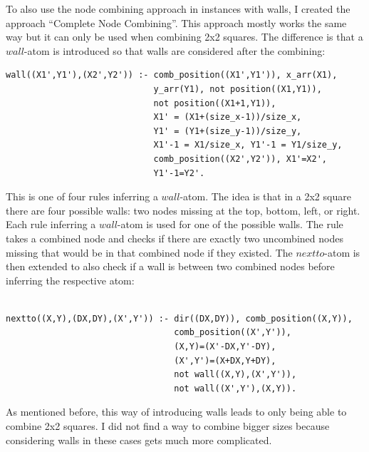 \documentclass[runningheads]{llncs}
\begin{document}
To also use the node combining approach in instances with walls, I created the approach ``Complete Node Combining''. This approach mostly works the same way but it can only be used when combining 2x2 squares. The difference is that a $wall$-atom is introduced so that walls are considered after the combining:
\begin{verbatim}
wall((X1',Y1'),(X2',Y2')) :- comb_position((X1',Y1')), x_arr(X1), 
                             y_arr(Y1), not position((X1,Y1)), 
                             not position((X1+1,Y1)),
                             X1' = (X1+(size_x-1))/size_x, 
                             Y1' = (Y1+(size_y-1))/size_y,
                             X1'-1 = X1/size_x, Y1'-1 = Y1/size_y,
                             comb_position((X2',Y2')), X1'=X2', 
                             Y1'-1=Y2'.
\end{verbatim}
This is one of four rules inferring a $wall$-atom. The idea is that in a 2x2 square there are four possible walls: two nodes missing at the top, bottom, left, or right. Each rule inferring a $wall$-atom is used for one of the possible walls. The rule takes a combined node and checks if there are exactly two uncombined nodes missing that would be in that combined node if they existed. The $nextto$-atom is then extended to also check if a wall is between two combined nodes before inferring the respective atom:
\begin{verbatim}

nextto((X,Y),(DX,DY),(X',Y')) :- dir((DX,DY)), comb_position((X,Y)), 
                                 comb_position((X',Y')),
                                 (X,Y)=(X'-DX,Y'-DY), 
                                 (X',Y')=(X+DX,Y+DY), 
                                 not wall((X,Y),(X',Y')), 
                                 not wall((X',Y'),(X,Y)).
\end{verbatim}
As mentioned before, this way of introducing walls leads to only being able to combine 2x2 squares. I did not find a way to combine bigger sizes because considering walls in these cases gets much more complicated. \\
\end{document}
